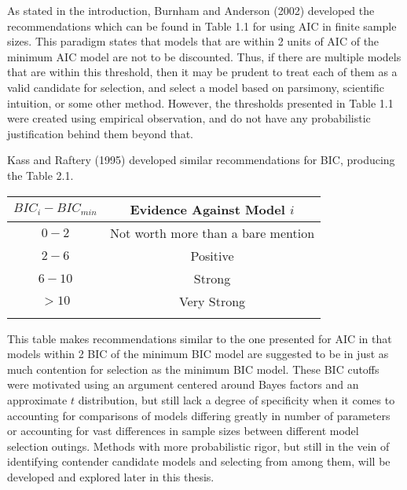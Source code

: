 		As stated in the introduction, Burnham and Anderson (2002) developed the recommendations which can be found in Table 1.1 for using AIC in finite sample sizes. This paradigm states that models
		that are within 2 units of AIC of the minimum AIC model are not to be discounted. Thus, if there are multiple models that are within this threshold, then it may be prudent to treat each of them
		as a valid candidate for selection, and select a model based on parsimony, scientific intuition, or some other method. However, the thresholds presented in Table 1.1 were created using empirical
		observation, and do not have any probabilistic justification behind them beyond that.

		Kass and Raftery (1995) developed similar recommendations for BIC, producing the Table 2.1.
		\begin{table}[h]
		\centering
		{
		\begin{tabular}{ c|c}
		$BIC_{i}-BIC_{min}$ & Evidence Against Model $i$\\
		 \hline
		 $0 - 2$ & Not worth more than a bare mention\\
		 $2 - 6$ & Positive\\
		 $6 - 10$ & Strong\\
		 $> 10$ & Very Strong\\
		 \Xhline{3\arrayrulewidth}
		\end{tabular}
		}
		\end{table}
		This table makes recommendations similar to the one presented for AIC in that models within 2 BIC of the minimum BIC model are suggested to be in just as much contention for selection as
		the minimum BIC model. These BIC cutoffs were motivated using an argument centered around Bayes factors and an approximate $t$ distribution, but still lack a degree of specificity when it comes 
		to accounting for comparisons of models differing greatly in number of parameters or accounting for vast differences in sample sizes between different model selection outings. Methods with
		more probabilistic rigor, but still in the vein of identifying contender candidate models and selecting from among them, will be developed and explored later in this thesis.

